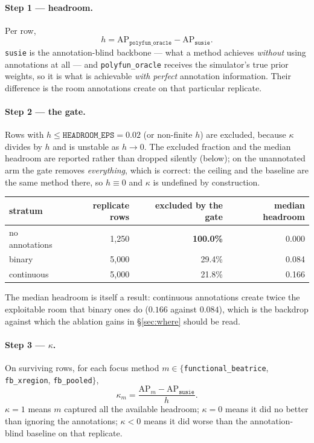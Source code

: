 \documentclass[11pt,a4paper]{article}
\begin{document}
\paragraph{Step 1 --- headroom.}
Per row,
\[
h=\mathrm{AP}_{\texttt{polyfun\_oracle}}-\mathrm{AP}_{\texttt{susie}} .
\]
\texttt{susie} is the annotation-blind backbone --- what a method achieves
\emph{without} using annotations at all --- and \texttt{polyfun\_oracle} receives
the simulator's true prior weights, so it is what is achievable \emph{with
perfect} annotation information. Their difference is the room annotations
create on that particular replicate.

\paragraph{Step 2 --- the gate.}
Rows with $h\le\texttt{HEADROOM\_EPS}=0.02$ (or non-finite $h$) are excluded,
because $\kappa$ divides by $h$ and is unstable as $h\to0$. The excluded
fraction and the median headroom are reported rather than dropped silently
(below); on the unannotated arm the gate removes \emph{everything}, which is
correct: the ceiling and the baseline are the same method there, so $h\equiv0$
and $\kappa$ is undefined by construction.

\begin{center}\small
\begin{tabular}{lrrr}\toprule
stratum & replicate rows & excluded by the gate & median headroom\\\midrule
no annotations     & 1{,}250 & \textbf{100.0\%} & 0.000\\
binary             & 5{,}000 & 29.4\% & 0.084\\
continuous         & 5{,}000 & 21.8\% & 0.166\\
\bottomrule\end{tabular}\end{center}

The median headroom is itself a result: continuous annotations create twice the
exploitable room that binary ones do ($0.166$ against $0.084$), which is the
backdrop against which the ablation gains in \S\ref{sec:where} should be read.

\paragraph{Step 3 --- $\kappa$.}
On surviving rows, for each focus method $m\in\{$\texttt{functional\_beatrice},
\texttt{fb\_xregion}, \texttt{fb\_pooled}$\}$,
\[
\kappa_m=\frac{\mathrm{AP}_m-\mathrm{AP}_{\texttt{susie}}}{h} .
\]
$\kappa=1$ means $m$ captured all the available headroom; $\kappa=0$ means it
did no better than ignoring the annotations; $\kappa<0$ means it did worse than
the annotation-blind baseline on that replicate.
\end{document}
